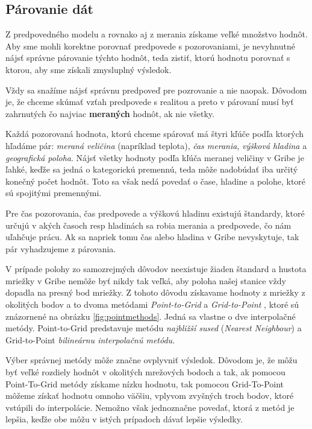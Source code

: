 \subsection{Párovanie dát}
Z predpovedného modelu a rovnako aj z merania získame veľké množstvo hodnôt. Aby sme mohli korektne porovnať predpovede s pozorovaniami, je nevyhnutné nájsť správne párovanie týchto hodnôt, teda zistiť, ktorú hodnotu porovnať s ktorou, aby sme získali zmysluplný výsledok.

Vždy sa snažíme nájsť správnu predpoveď pre pozrovanie a nie naopak.
Dôvodom je, že chceme skúmať vzťah predpovede s realitou a preto v párovaní musí byť zahrnutých čo najviac \textbf{meraných} hodnôt, ak nie všetky.

Každá pozorovaná hodnota, ktorú chceme spárovať má štyri kľúče podľa ktorých hľadáme pár: \textit{meraná veličina} (napríklad teplota), \textit{čas merania}, \textit{výšková hladina} a \textit{geografická poloha}.
Nájsť všetky hodnoty podľa kľúča meranej veličiny v Gribe je ľahké, keďže sa jedná o kategorickú premennú, teda môže nadobúdať iba určitý konečný počet hodnôt. Toto sa však nedá povedať o čase, hladine a polohe, ktoré sú spojitými premennými.
 
Pre čas pozorovania, čas predpovede a výškovú hladinu existujú štandardy, ktoré určujú v akých časoch resp hladinách sa robia merania a predpovede, čo nám uľahčuje prácu. Ak sa napriek tomu čas alebo hladina v Gribe nevyskytuje, tak pár vyhadzujeme z párovania. 

V prípade polohy zo samozrejmých dôvodov neexistuje žiaden štandard a hustota mriežky v Gribe nemôže byť nikdy tak veľká, aby poloha našej stanice vždy dopadla na presný bod mriežky. Z tohoto dôvodu získavame hodnoty z mriežky z okolitých bodov a to dvoma metódami \textit{Point-to-Grid} a \textit{Grid-to-Point} \cite{IntroToVerif}, ktoré sú znázornené na obrázku \ref{fig:pointmethods}. Jedná sa vlastne o dve interpolačné metódy. Point-to-Grid predstavuje metódu \textit{najbližší sused} (\textit{Nearest Neighbour}) a Grid-to-Point \textit{bilineárnu interpolačnú metódu}. 

Výber správnej metódy môže značne ovplyvniť výsledok. Dôvodom je, že môžu byť veľké rozdiely hodnôt v okolitých mrežových bodoch a tak, ak pomocou Point-To-Grid metódy získame nízku hodnotu, tak pomocou Grid-To-Point môžeme získať hodnotu omnoho väčšiu, vplyvom zvyšných troch bodov, ktoré vstúpili do interpolácie. Nemožno však jednoznačne povedať, ktorá z metód je lepšia, keďže obe môžu v istých prípadoch dávať lepšie výsledky. 

